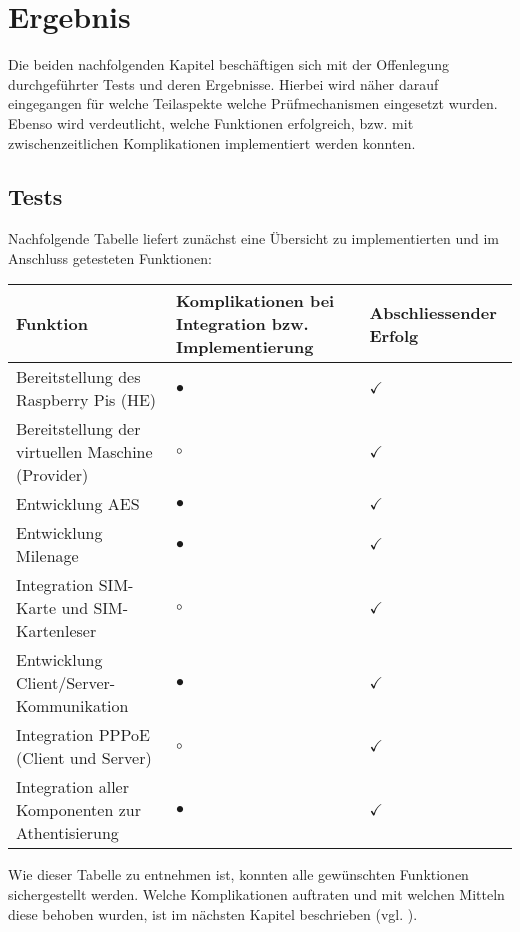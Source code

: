 \section{Ergebnis}
	Die beiden nachfolgenden Kapitel beschäftigen sich mit der Offenlegung durchgeführter Tests und deren Ergebnisse.
	Hierbei wird näher darauf eingegangen für welche Teilaspekte welche Prüfmechanismen
	eingesetzt wurden. Ebenso wird verdeutlicht, welche Funktionen erfolgreich, bzw.
	mit zwischenzeitlichen Komplikationen implementiert werden konnten.

	\subsection{Tests}
	Nachfolgende Tabelle liefert zunächst eine Übersicht zu implementierten und im Anschluss
	getesteten Funktionen:

	\begin{tabularx}{\textwidth}{|X||X|X|}
    \hline
      \textbf{Funktion} & \textbf{Komplikationen bei Integration bzw. Implementierung} & \textbf{Abschliessender Erfolg} \\
    \hline
    \hline
     	Bereitstellung des Raspberry Pis (HE) & $\bullet$ & $\checkmark$ \\
    \hline
    \hline
     	Bereitstellung der virtuellen Maschine (Provider) & $\circ$ & $\checkmark$ \\
    \hline
    \hline
     	Entwicklung AES & $\bullet$ & $\checkmark$ \\
    \hline
    \hline
    	Entwicklung Milenage & $\bullet$ & $\checkmark$ \\
    \hline
    \hline
    	Integration SIM-Karte und SIM-Kartenleser & $\circ$ & $\checkmark$ \\
    \hline
    \hline
    	Entwicklung Client/Server-Kommunikation & $\bullet$ & $\checkmark$ \\
    \hline
    \hline
    	Integration PPPoE (Client und Server) & $\circ$ & $\checkmark$ \\
    \hline
    \hline
    	Integration aller Komponenten zur Athentisierung & $\bullet$ & $\checkmark$ \\
    \hline
    \end{tabularx}

    Wie dieser Tabelle zu entnehmen ist, konnten alle gewünschten Funktionen sichergestellt werden.
    Welche Komplikationen auftraten und mit welchen Mitteln diese behoben wurden, ist im
    nächsten Kapitel beschrieben (vgl. ).


